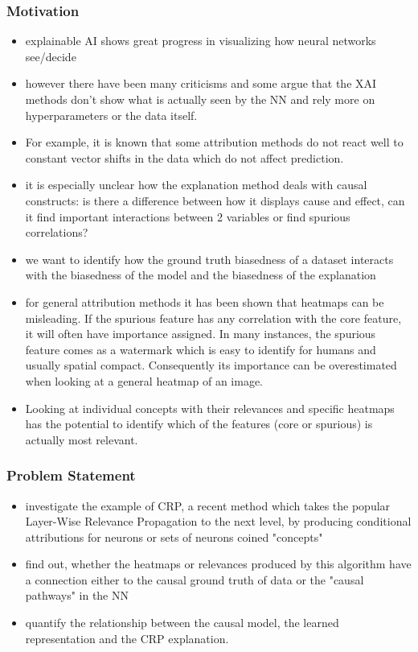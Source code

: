 \subsubsection*{Motivation}
\begin{itemize}
    \item explainable AI shows great progress in visualizing how neural networks see/decide
    \item however there have been many criticisms and some argue that the XAI methods don't show what is actually seen by the NN and rely more on hyperparameters or the data itself.
    \item For example, it is known that some attribution methods do not react well to constant vector shifts in the data which do not affect prediction.
    \item it is especially unclear how the explanation method deals with causal constructs: is there a difference between how it displays cause and effect, can it find important interactions between 2 variables or find spurious correlations?
    \item we want to identify how the ground truth biasedness of a dataset interacts with the biasedness of the model and the biasedness of the explanation
    \item for general attribution methods it has been shown that heatmaps can be misleading. If the spurious feature has any correlation with the core feature, it will often have importance assigned. In many instances, the spurious feature comes as a watermark which is easy to identify for humans and usually spatial compact. Consequently its importance can be overestimated when looking at a general heatmap of an image.
    \item Looking at individual concepts with their relevances and specific heatmaps has the potential to identify which of the features (core or spurious) is actually most relevant.
\end{itemize}

\subsubsection*{Problem Statement}
\begin{itemize}
    \item investigate the example of CRP, a recent method which takes the popular Layer-Wise Relevance Propagation to the next level, by producing conditional attributions for neurons or sets of neurons coined "concepts"
    \item find out, whether the heatmaps or relevances produced by this algorithm have a connection either to the causal ground truth of data or the "causal pathways" in the NN
    \item quantify the relationship between the causal model, the learned representation and the CRP explanation.
\end{itemize}

